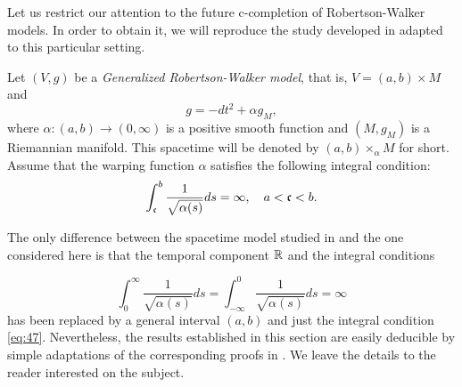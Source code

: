 Let us restrict our attention to the future c-completion of Robertson-Walker models. In order to obtain it, we will reproduce the study developed in \cite[Section 3]{FHSIso2} adapted to this particular setting.

\smallskip

Let $(V,g)$ be a {\em Generalized Robertson-Walker model}, that is, $V=(a,b)\times M$
and
\[
g=-dt^2+\alpha g_M,
\]
where $\alpha:(a,b)\rightarrow (0,\infty)$ is a positive smooth function and $(M,g_{M})$ is a Riemannian manifold. This spacetime will be denoted by $(a,b) \times_{\alpha} M$ for short. Assume that the warping function $\alpha$ satisfies the following integral condition:
\begin{equation}
  \label{eq:47}
  \int_{\mathfrak{c}}^{b}\frac{1}{\sqrt{\alpha(s)}}ds=\infty,\quad a<\mathfrak{c}<b.
\end{equation}


\begin{rem}
  The only difference between the spacetime model studied in \cite{FHSIso2} and the one considered here is that  the temporal component ${\mathbb R}$ and the integral conditions

  \[
   \int^{\infty}_{0}\frac{1}{\sqrt{\alpha(s)}}ds=\int^{0}_{-\infty}\frac{1}{\sqrt{\alpha(s)}}ds=\infty
    \]
  has been replaced by a general interval $(a,b)$ and just the integral condition \eqref{eq:47}.
Nevertheless, the results established in this section are easily deducible by simple adaptations of the corresponding proofs in \cite{FHSIso2}. We leave the details to the reader interested on the subject.
\end{rem}

